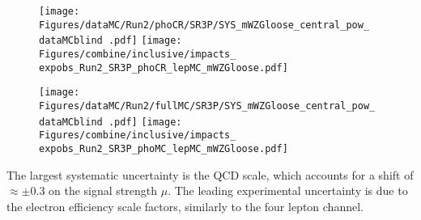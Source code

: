 \label{sec:impacts_SR3P_inclusive}

\begin{figure}
  \centering
  \texttt{[image: Figures/dataMC/Run2/phoCR/SR3P/SYS\_mWZGloose\_central\_pow\_\\dataMCblind .pdf]}
  \hfill
  \texttt{[image: Figures/combine/inclusive/impacts\_\\expobs\_Run2\_SR3P\_phoCR\_lepMC\_mWZGloose.pdf]}
  \caption{}
  \label{fig:inclusive_cutID_phoCR_mWZGloose}
\end{figure}

\begin{figure}
  \centering
  \texttt{[image: Figures/dataMC/Run2/fullMC/SR3P/SYS\_mWZGloose\_central\_pow\_\\dataMCblind .pdf]}
  \hfill
  \texttt{[image: Figures/combine/inclusive/impacts\_\\expobs\_Run2\_SR3P\_phoMC\_lepMC\_mWZGloose.pdf]}
  \caption{}
  \label{fig:inclusive_cutID_phoMC_mWZGloose}
\end{figure}

The largest systematic uncertainty is the QCD scale, which accounts for a shift of
$\approx \pm 0.3$ on the signal strength $\mu$.
The leading experimental uncertainty is due to the electron efficiency scale factors,
similarly to the four lepton channel.
